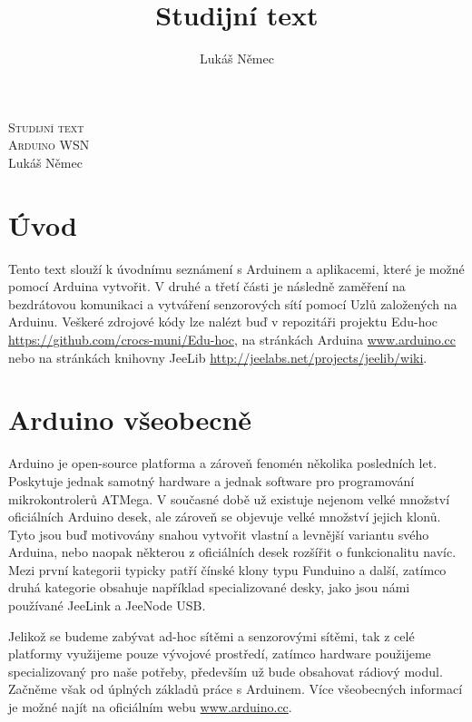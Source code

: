 \documentclass[12pt,titlepage]{article}
\title{Studijní text}
\author{Lukáš Němec}
\begin{document}
\begin{titlepage}
\begin{center}
\textsc{\LARGE Studijní text}\\[1cm]
\textsc{\Large Arduino WSN}\\[0.6cm]


\Large{Lukáš Němec}\\[1cm]

\bigskip
\bigskip

\end{center}
\end{titlepage}



\tableofcontents
\newpage


\section{Úvod}
Tento text slouží k úvodnímu seznámení s Arduinem a aplikacemi, které je možné pomocí Arduina vytvořit. V druhé a třetí části je následně zaměření na bezdrátovou komunikaci a vytváření senzorových sítí pomocí Uzlů založených na Arduinu. Veškeré zdrojové kódy lze nalézt buď v repozitáři projektu Edu-hoc \url{https://github.com/crocs-muni/Edu-hoc}, na stránkách Arduina \url{www.arduino.cc} nebo na stránkách knihovny JeeLib \url{http://jeelabs.net/projects/jeelib/wiki}.

\section{Arduino všeobecně}
Arduino je open-source platforma a zároveň fenomén několika posledních let. Poskytuje jednak samotný hardware a jednak software pro programování mikrokontrolerů ATMega. V současné době už existuje nejenom velké množství oficiálních Arduino desek, ale zároveň se objevuje velké množství jejich klonů. Tyto jsou buď motivovány snahou vytvořit vlastní a levnější variantu svého Arduina, nebo naopak některou z oficiálních desek rozšířit o funkcionalitu navíc. Mezi první kategorii typicky patří čínské klony typu Funduino a další, zatímco druhá kategorie obsahuje například specializované desky, jako jsou námi používané JeeLink a JeeNode USB.

Jelikož se budeme zabývat ad-hoc sítěmi a senzorovými sítěmi, tak z celé platformy využijeme pouze vývojové prostředí, zatímco hardware použijeme specializovaný pro naše potřeby, především už bude obsahovat rádiový modul. Začněme však od úplných základů práce s Arduinem. Více všeobecných informací je možné najít na oficiálním webu
\url{www.arduino.cc}.
\end{document}
